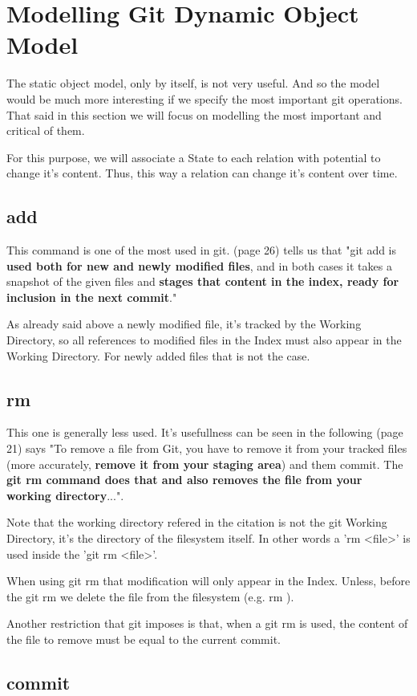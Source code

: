 \section {Modelling Git Dynamic Object Model}

The static object model, only by itself, 
is not very useful. And so
the model would be much more interesting if we specify 
the most important git operations. That said in this
section we will focus on modelling the most important
and critical of them. \par
For this purpose, we will associate a State to each relation
with potential to change it's content. Thus, this way a relation
can change it's content over time.

\subsection{add}

This command is one of the most used in git. \cite{gitComm} (page 26)
tells us that
"git add is {\bf used both for new and newly modified files},
and in both cases it takes a snapshot of the given files
and {\bf stages that content in the index, ready for inclusion
in the next commit}." \par 
As already said above a newly modified file, it's tracked by
the Working Directory, so all references to modified files in
the Index must also appear in the Working Directory. For newly
added files that is not the case.

\subsection{rm}

This one is generally less used. It's usefullness can be
seen in the following \cite{progit}
(page 21) says "To remove a file from Git, you have to remove it
from your tracked files (more accurately, {\bf remove it from your
staging area}) and them commit. The {\bf git rm command does that
and also removes the file from your working directory}...". \par
Note that the working directory refered in the citation is not
the git Working Directory, it's the directory of the filesystem itself.
In other words a 'rm <file>' is used inside the 'git rm <file>'. \par
When using git rm
that modification will only appear in the Index. Unless, before
the git rm we delete the file from the filesystem (e.g. rm ). \par
Another restriction that git imposes is that, when a git rm is used, the
content of the file to remove must be equal to the current commit. \par


\subsection{commit}

